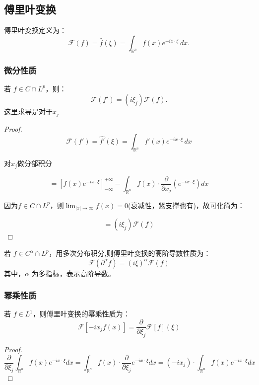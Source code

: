 \documentclass[12pt,a4paper]{article}
\numberwithin{subsection}{section}   %
\numberwithin{subsubsection}{subsection}
\theoremstyle{plain}
\theoremstyle{definition}
\theoremstyle{remark}
\theoremstyle{remark}
\begin{document}
	\subsection{傅里叶变换}
	傅里叶变换定义为：
	\begin{equation}
		\mathcal{F}(f) = \hat{f}(\xi) = \int_{\mathbb{R}^n} f(x) e^{-i x \cdot \xi} \, dx.
	\end{equation}
	
	\subsubsection{微分性质}
	若 \( f \in C \cap L^p \)，则：
	\begin{equation}
		\mathcal{F}(f') = (i \xi_j) \mathcal{F}(f).
	\end{equation}
	这里求导是对于$x_j$
	
	\begin{proof}
		\[
			\mathcal{F}(f') = \hat{f'}(\xi) = \int_{\mathbb{R}^n} f'(x) e^{-i x \cdot \xi} \, dx
		\]
		
		对$x_j$做分部积分
		
	\[
			= \left[ f(x) e^{-i x \cdot \xi} \right]_{-\infty}^{+\infty} - \int_{\mathbb{R}^n} f(x) \cdot \frac{\partial}{\partial x_j} \left( e^{-i x \cdot \xi} \right) dx
		\]	
		
		因为\( f \in C \cap L^p \)，则$\lim_{|x| \to \infty} f(x) = 0$(衰减性，紧支撑也有)，故可化简为：
		
	\[	
			= (i \xi_j) \mathcal{F}(f)
	\]	
	\end{proof}
	
	若 \( f \in C^\alpha \cap L^p \)，用多次分布积分,则傅里叶变换的高阶导数性质为：
	\begin{equation}\label{weifen}
		\mathcal{F}(\partial^\alpha f) = (i \xi)^\alpha \mathcal{F}(f)
	\end{equation}
	其中，\(\alpha\) 为多指标，表示高阶导数。
	
	
		\subsubsection{幂乘性质}
	若 \( f \in L^1 \)，则傅里叶变换的幂乘性质为：
	\begin{equation}
		\mathcal{F}[-i x_j f(x)] = \frac{\partial}{\partial \xi_j} \mathcal{F}[f](\xi)
	\end{equation}
	
	\begin{proof}
		\[	
		\frac{\partial}{\partial \xi_j} \int_{\mathbb{R}^n} f(x) e^{-i x \cdot \xi} dx = \int_{\mathbb{R}^n} f(x) \cdot \frac{\partial}{\partial \xi_j} e^{-i x \cdot \xi} dx= (-i x_j) \cdot \int_{\mathbb{R}^n} f(x) e^{-i x \cdot \xi} dx
	\]	
	
\end{proof}
	
\end{document}
